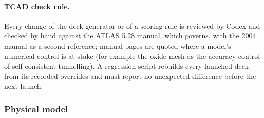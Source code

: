 \paragraph{TCAD check rule.} Every change of the deck generator or of a scoring rule is reviewed by Codex and checked
by hand against the ATLAS 5.28 manual, which governs, with the 2004 manual as a second reference; manual pages are
quoted where a model's numerical control is at stake (for example the oxide mesh as the accuracy control of
self-consistent tunnelling). %
A regression script rebuilds every launched deck from its recorded overrides and must report no unexpected
difference before the next launch. %

\subsubsection{Physical model}
\label{sec:m-tcad-model}

